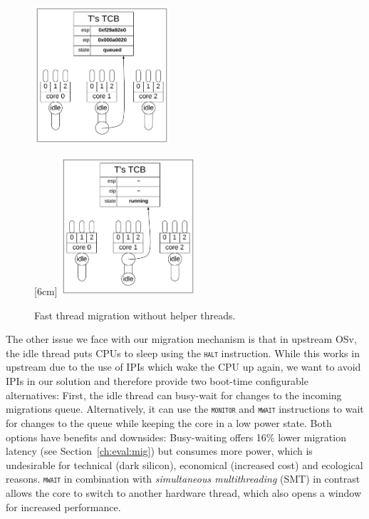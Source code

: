\documentclass[12pt,a4paper]{book}
\begin{document}
\begin{figure}
{    \includegraphics[width=5cm]{fig_build/mig3}
    }
    \hfill
    \par
    \bigskip
    [6cm]{
    \includegraphics[width=5cm]{fig_build/mig4}
    }
    \caption{Fast thread migration without helper threads.}
    \label{fig:di:mig}
\end{figure}

The other issue we face with our migration mechanism is that in upstream OSv, the idle thread puts CPUs to sleep using the \textsc{\texttt{halt}} instruction.
While this works in upstream due to the use of IPIs which wake the CPU up again, we want to avoid IPIs in our solution and therefore provide two boot-time configurable alternatives:
First, the idle thread can busy-wait for changes to the incoming migrations queue.
Alternatively, it can use the \textsc{\texttt{monitor}} and \textsc{\texttt{mwait}} instructions to wait for changes to the queue while keeping the core in a low power state.
Both options have benefits and downsides:
Busy-waiting offers 16\% lower migration latency (see Section~\ref{ch:eval:mig}) but consumes more power, which is undesirable for technical (dark silicon), economical (increased cost) and ecological reasons.
\textsc{\texttt{mwait}} in combination with \emph{simultaneous multithreading} (SMT) in contrast allows the core to switch to another hardware thread, which also opens a window for increased performance.~\cite{intelSDMMWAIT,darkSilicon}
\end{document}
